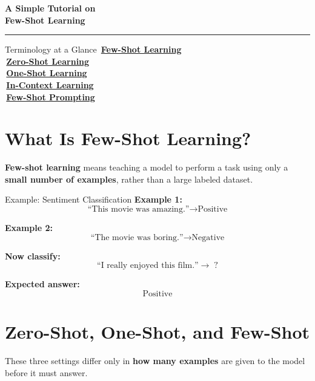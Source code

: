 \documentclass[11pt]{article}
\newcommand{\glosslink}[2]{%
  \noindent{\color{glossgold}\textbullet}\;\,\textbf{\color{glossp}\hyperref[#2]{#1}}\\[6pt]
}
\begin{document}
\begin{center}
  {\Huge\bfseries\color{deepblue} A Simple Tutorial on\\[2pt] Few-Shot Learning}\\[4pt]
  {\color{accent}\rule{0.4\linewidth}{1pt}}
\end{center}
\vspace{8pt}

\begin{center}
\begin{glossarybox}{Terminology at a Glance}
\glosslink{Few-Shot Learning}{sec:whatisfewshot}
\glosslink{Zero-Shot Learning}{sec:zerooneshot}
\glosslink{One-Shot Learning}{sec:zerooneshot}
\glosslink{In-Context Learning}{sec:incontext}
\noindent{\color{glossgold}\textbullet}\;\,\textbf{\color{glossp}\hyperref[sec:fewshotprompting]{Few-Shot Prompting}}
\end{glossarybox}
\end{center}

\section*{What Is Few-Shot Learning?}
\label{sec:whatisfewshot}

\textbf{Few-shot learning} means teaching a model to perform a task using only a \textbf{small number of examples}, rather than a large labeled dataset.

\begin{stepbox}{Example: Sentiment Classification}
\textbf{Example 1:}
\[
\text{``This movie was amazing.''} \rightarrow \text{Positive}
\]

\textbf{Example 2:}
\[
\text{``The movie was boring.''} \rightarrow \text{Negative}
\]

\textbf{Now classify:}
\[
\text{``I really enjoyed this film.''} \rightarrow \; ?
\]

\textbf{Expected answer:}
\[
\boxed{\text{Positive}}
\]
\end{stepbox}


\section*{Zero-Shot, One-Shot, and Few-Shot}
\label{sec:zerooneshot}

These three settings differ only in \textbf{how many examples} are given to the model before it must answer.
\end{document}
